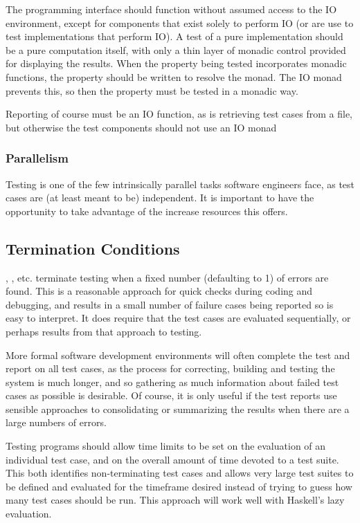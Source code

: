 The programming interface should function without assumed access to the IO environment,
except for components that exist solely to perform IO
(or are use to test implementations that perform IO).
A test of a pure implementation should be a pure computation itself,
with only a thin layer of monadic control provided for displaying the results.
When the property being tested incorporates monadic functions,
the property should be written to resolve the monad.
The IO monad prevents this, so then the property must be tested in a monadic way.


Reporting of course must be an IO function,
as is retrieving test cases from a file,
but otherwise the test components should not use an IO monad

\subsubsection{Parallelism}
Testing is one of the few intrinsically parallel tasks software engineers face,
as test cases are (at least meant to be) independent.
It is important to have the opportunity to take advantage of the increase resources this offers.

\subsection{Termination Conditions}

\QC, \SC, etc. terminate testing when a fixed number (defaulting to 1) of errors are found.
This is a reasonable approach for quick checks during coding and debugging,
and results in a small number of failure cases being reported so is easy to interpret.
It does require that the test cases are evaluated sequentially,
or perhaps results from that approach to testing.

More formal software development environments
will often complete the test and report on all test cases,
as the process for correcting, building and testing the system is much longer,
and so gathering as much information about failed test cases as possible is desirable.
Of course, it is only useful if the test reports use sensible approaches to 
consolidating or summarizing the results when there are a large numbers of errors.

Testing programs should allow time limits to be set on 
the evaluation of an individual test case,
and on the overall amount of time devoted to a test suite.
This both identifies non-terminating test cases
and allows very large test suites to be defined
and evaluated for the timeframe desired
instead of trying to guess how many test cases should be run.
This approach will work well with Haskell's lazy evaluation.



